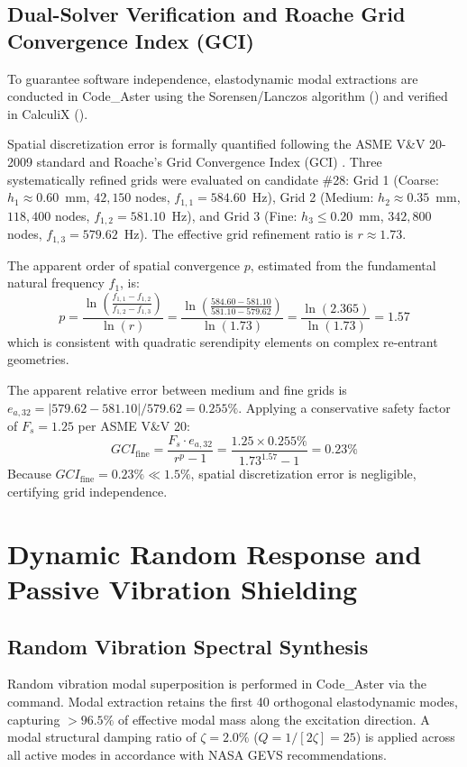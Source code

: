 \documentclass[preprint,12pt,3p]{elsarticle}
\newcommand{\code}[1]{\texttt{\detokenize{#1}}}
\begin{document}
\subsection{Dual-Solver Verification and Roache Grid Convergence Index (GCI)}
To guarantee software independence, elastodynamic modal extractions are conducted in Code\_Aster using the Sorensen/Lanczos algorithm (\code{METHODE='SORENSEN'}) and verified in CalculiX (\code{ccx}). 

Spatial discretization error is formally quantified following the ASME V\&V 20-2009 standard and Roache's Grid Convergence Index (GCI) \cite{roache1998,asme2009}. Three systematically refined grids were evaluated on candidate \#28: Grid 1 (Coarse: $h_1 \approx 0.60$~mm, $42,150$ nodes, $f_{1,1} = 584.60$~Hz), Grid 2 (Medium: $h_2 \approx 0.35$~mm, $118,400$ nodes, $f_{1,2} = 581.10$~Hz), and Grid 3 (Fine: $h_3 \le 0.20$~mm, $342,800$ nodes, $f_{1,3} = 579.62$~Hz). The effective grid refinement ratio is $r \approx 1.73$.

The apparent order of spatial convergence $p$, estimated from the fundamental natural frequency $f_1$, is:
\begin{equation}
  p = \frac{\ln\left( \frac{f_{1,1} - f_{1,2}}{f_{1,2} - f_{1,3}} \right)}{\ln(r)} = \frac{\ln\left( \frac{584.60 - 581.10}{581.10 - 579.62} \right)}{\ln(1.73)} = \frac{\ln(2.365)}{\ln(1.73)} = 1.57
\end{equation}
which is consistent with quadratic serendipity elements on complex re-entrant geometries.

The apparent relative error between medium and fine grids is $e_{a,32} = |579.62 - 581.10| / 579.62 = 0.255\%$. Applying a conservative safety factor of $F_s = 1.25$ per ASME V\&V 20:
\begin{equation}
  GCI_{\text{fine}} = \frac{F_s \cdot e_{a,32}}{r^p - 1} = \frac{1.25 \times 0.255\%}{1.73^{1.57} - 1} = 0.23\%
\end{equation}
Because $GCI_{\text{fine}} = 0.23\% \ll 1.5\%$, spatial discretization error is negligible, certifying grid independence.

\section{Dynamic Random Response and Passive Vibration Shielding}
\label{sec:shielding}

\subsection{Random Vibration Spectral Synthesis}
Random vibration modal superposition is performed in Code\_Aster via the \code{DYNA_ALEA_MODAL} command. Modal extraction retains the first 40 orthogonal elastodynamic modes, capturing $>96.5\%$ of effective modal mass along the excitation direction. A modal structural damping ratio of $\zeta = 2.0\%$ ($Q = 1 / [2\zeta] = 25$) is applied across all active modes in accordance with NASA GEVS recommendations.
\end{document}
